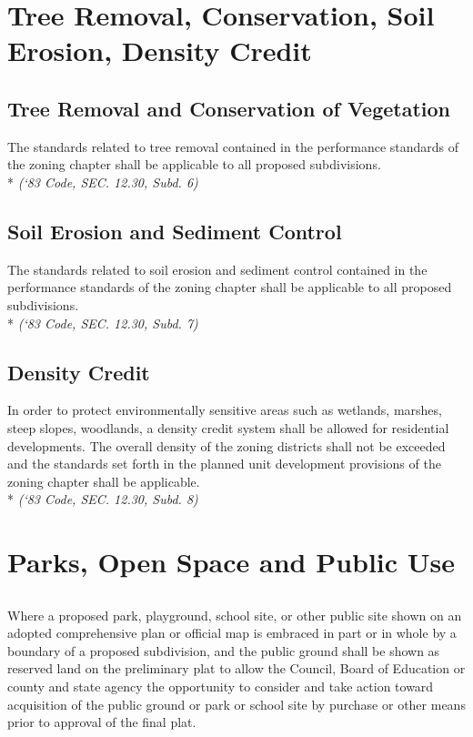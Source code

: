 \section{Tree Removal, Conservation, Soil Erosion, Density Credit}
\subsection{Tree Removal and Conservation of Vegetation}
The standards related to tree removal contained in the performance standards of the zoning chapter shall be applicable to all proposed subdivisions.\\*
\emph{(‘83 Code, SEC. 12.30, Subd. 6)}
\subsection{Soil Erosion and Sediment Control}
The standards related to soil erosion and sediment control contained in the performance standards of the zoning chapter shall be applicable to all proposed subdivisions.\\*
\emph{(‘83 Code, SEC. 12.30, Subd. 7)}
\subsection{Density Credit}
In order to protect environmentally sensitive areas such as wetlands, marshes, steep slopes, woodlands, a density credit system shall be allowed for residential developments.  The overall density of the zoning districts shall not be exceeded and the standards set forth in the planned unit development provisions of the zoning chapter shall be applicable.\\*
\emph{(‘83 Code, SEC. 12.30, Subd. 8)}

\section{Parks, Open Space and Public Use}
\subsection{}
Where a proposed park, playground, school site, or other public site shown on an adopted comprehensive plan or official map is embraced in part or in whole by a boundary of a proposed subdivision, and the public ground shall be shown as reserved land on the preliminary plat to allow the Council, Board of Education or county and state agency the opportunity to consider and take action toward acquisition of the public ground or park or school site by purchase or other means prior to approval of the final plat.
